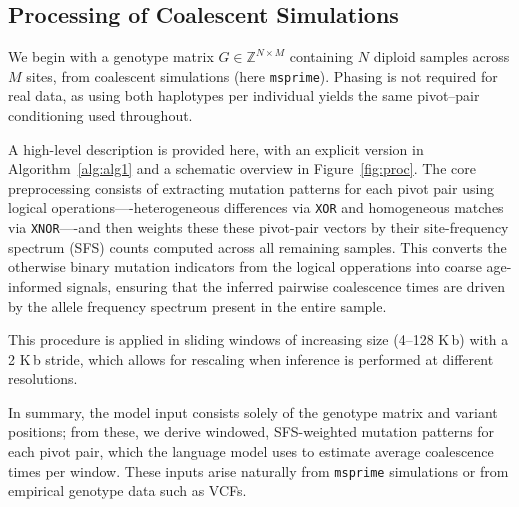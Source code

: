 \documentclass{article}
\let\citep\parencite
\begin{document}
{

\subsection*{Processing of Coalescent Simulations}

We begin with a genotype matrix $G \in \mathbb{Z}^{N \times M}$ 
containing $N$ diploid samples across $M$ sites, 
from coalescent simulations (here \texttt{msprime}). 
Phasing is not required for real data, 
as using both haplotypes per individual yields the same pivot–pair 
conditioning used throughout.

A high-level description is provided here, 
with an explicit version in Algorithm~\ref{alg:alg1} 
and a schematic overview in Figure~\ref{fig:proc}. 
The core preprocessing consists of extracting mutation patterns for each pivot pair
using logical operations—-heterogeneous differences via \texttt{XOR} 
and homogeneous matches via \texttt{XNOR}—-and then weights these these pivot-pair vectors
by their site-frequency spectrum (SFS) counts computed across all remaining samples. 
This converts the otherwise binary mutation indicators from the logical opperations
into coarse age-informed signals, 
ensuring that the inferred pairwise coalescence times are driven 
by the allele frequency spectrum present in the entire sample.

This procedure is applied in sliding windows of increasing size (4–128 K\,b)
with a 2 K\,b stride, which allows for rescaling when
inference is performed at different resolutions. 

In summary, the model input consists solely of the genotype matrix and variant positions; 
from these, we derive windowed, SFS-weighted mutation patterns for each pivot pair, 
which the language model uses to estimate average coalescence times per window. 
These inputs arise naturally from \texttt{msprime} simulations or from empirical genotype data such as VCFs.


}
\end{document}
